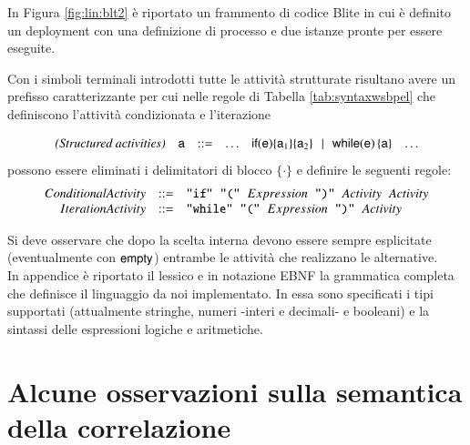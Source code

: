 In Figura \ref{fig:lin:blt2} è riportato un frammento di codice Blite in cui è
definito un deployment con una definizione di processo e due istanze pronte per
essere eseguite.

Con i simboli terminali introdotti tutte le attività strutturate risultano
avere un prefisso caratterizzante per cui nelle regole di Tabella
\ref{tab:syntaxwsbpel} che definiscono l'attività condizionata e l'iterazione  

$$
\begin{array}{rccccl}
\textit{(Structured activities)} & \xs & ::= & \ldots  &
\xif{\xe}{\xs_1}{\xs_2} \!\sepgr\! \xwhile{\xe}{\xs} & \ldots
\end{array}
$$ 
possono essere eliminati i delimitatori di blocco $\{\cdot \}$ e definire le
seguenti regole: $$
\begin{array}{rcl}
ConditionalActivity & ::= & \verb#"if"# \hspace{0.2cm} \verb#"("#
\hspace{0.2cm} Expression \hspace{0.2cm} \verb#")"#  \hspace{0.2cm} Activity
\hspace{0.2cm} Activity \\

IterationActivity & ::= & \verb#"while"# \hspace{0.2cm} \verb#"("#
\hspace{0.2cm} Expression \hspace{0.2cm} \verb#")"#  \hspace{0.2cm} Activity \\
\end{array}
$$

Si deve osservare che dopo la scelta interna devono essere sempre esplicitate
(eventualmente con ${\sf empty}$) entrambe le attività che realizzano le
alternative.
\\

In appendice è riportato il lessico e in notazione EBNF la grammatica completa
che definisce il linguaggio da noi implementato. In essa sono specificati
i tipi supportati (attualmente stringhe, numeri -interi e decimali- e booleani)
e la sintassi delle espressioni logiche e aritmetiche.

\section{Alcune osservazioni sulla semantica della correlazione}
